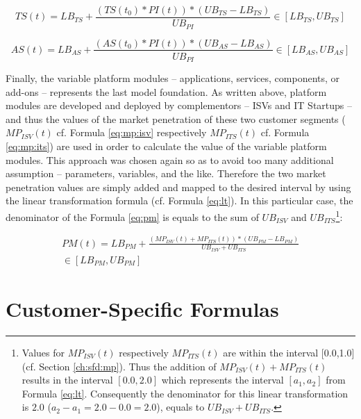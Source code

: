 \begin{equation}\label{eq:ts}
	TS(t) = LB_{TS} +  \frac{(TS(t_0) * PI(t)) * (UB_{TS} - LB_{TS})}{UB_{PI}} \in [LB_{TS},UB_{TS}]
\end{equation}

\begin{equation}\label{eq:as}
	AS(t) = LB_{AS} +  \frac{(AS(t_0) * PI(t)) * (UB_{AS} - LB_{AS})}{UB_{PI}} \in [LB_{AS},UB_{AS}]
\end{equation} 

Finally, the variable platform modules -- applications, services, components, or add-ons -- represents the last model foundation. As written above, platform modules are developed and deployed by complementors -- \acp{ISV} and \ac{IT} Startups -- and thus the values of the market penetration of these two customer segments ($MP_{ISV}(t)$ cf. Formula \ref{eq:mp:isv} respectively $MP_{ITS}(t)$ cf. Formula \ref{eq:mp:its}) are used in order to calculate the value of the variable platform modules. This approach was chosen again so as to avoid too many additional assumption -- parameters, variables, and the like. Therefore the two market penetration values are simply added and mapped to the desired interval by using the linear transformation formula (cf. Formula \ref{eq:lt}). In this particular case, the denominator of the Formula \ref{eq:pm} is equals to the sum of $UB_{ISV}$ and $UB_{ITS}$\footnote{Values for $MP_{ISV}(t)$ respectively $MP_{ITS}(t)$ are within the interval [0.0,1.0] (cf. Section \ref{ch:sfd:mp}). Thus the addition of $MP_{ISV}(t) + MP_{ITS}(t)$ results in the interval $[0.0,2.0]$ which represents the interval $[a_1,a_2]$ from Formula \ref{eq:lt}. Consequently the denominator for this linear transformation is $2.0$ ($a_2 - a_1 = 2.0 - 0.0 = 2.0$), equals to $UB_{ISV} + UB_{ITS}$.}:

\begin{eqnarray}\label{eq:pm}
	PM(t) = LB_{PM} + \frac{(MP_{ISV}(t) + MP_{ITS}(t)) * (UB_{PM} - LB_{PM})}{UB_{ISV} + UB_{ITS}} \nonumber \\ \in [LB_{PM},UB_{PM}]
\end{eqnarray}

\section{Customer-Specific Formulas}\label{ch:sfd:csf}

